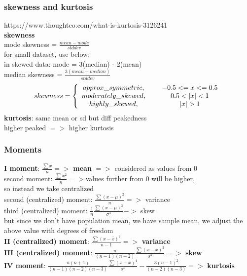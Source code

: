 \documentclass{beamer}
\begin{document}
\begin{frame}\frametitle{skewness and kurtosis}
https://www.thoughtco.com/what-is-kurtosis-3126241\\
\textbf{skewness}\\
mode skewness = $\frac{mean-mode}{std dev}$\\
for small dataset, use below:\\
in skewed data: mode = 3(median) - 2(mean) \\
median skewness = $\frac{3(mean-median)}{std dev}$\\
\begin{align}
skewness = \left\{ \begin{array}{cc} 
approx\_symmetric, & \hspace{5mm} -0.5 <= x <=0.5 \\
moderately\_skewed, & \hspace{5mm} 0.5< |x| <1 \\
highly\_skewed, & \hspace{5mm} |x|>1 \\
\end{array} \right.
\end{align}
\textbf{kurtosis}: same mean or sd but diff peakedness\\
higher peaked $=>$ higher kurtosis \\	

\end{frame}

\begin{frame}\frametitle{Moments}
\textbf{I moment}: $\frac{\sum x}{n} =>$ \textbf{mean} $=>$ considered as values from 0\\
second moment: $\frac{\sum x^2}{n} => $values further from 0 will be higher, \\so instead we take centralized \\
second (centralized) moment: $\frac{\sum (x-\mu)^2}{n} =>$ variance\\
third (centralized) moment: $\frac{1}{n} \frac{\sum (x-\mu)^3}{\sigma ^3} ->$ skew\\
but since we don't have population mean, we have sample mean, we adjust the above value with degrees of freedom\\
\textbf{II (centralized) moment}: $\frac{\sum (x-\bar{x})^2}{n-1} =>$ \textbf{variance}\\
\textbf{III (centralized) moment}: $\frac{n}{(n-1)(n-2)} \frac{\sum (x-\bar{x})^3}{s^3} =>$ \textbf{skew}\\
\textbf{IV moment}: $\frac{n(n+1)}{(n-1)(n-2)(n-3)} \frac{\sum (x-\bar{x})^4}{s^4}-\frac{3(n-1)^2}{(n-2)(n-3)} =>$ \textbf{kurtosis}\\

\end{frame}
\end{document}
